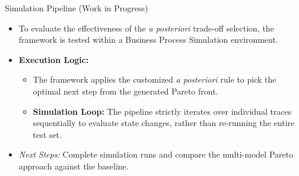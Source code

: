 \documentclass[aspectratio=169]{beamer} %
\begin{document}
\begin{frame}{Simulation Pipeline (Work in Progress)}
    \begin{itemize}
        \item To evaluate the effectiveness of the \textit{a posteriori} trade-off selection, the framework is tested within a Business Process Simulation environment.
        \item \textbf{Execution Logic:}
        \begin{itemize}
            \item The framework applies the customized \textit{a posteriori} rule to pick the optimal next step from the generated Pareto front.
            \item \textbf{Simulation Loop:} The pipeline strictly iterates over individual traces sequentially to evaluate state changes, rather than re-running the entire test set.
        \end{itemize}
        \item \textit{Next Steps:} Complete simulation runs and compare the multi-model Pareto approach against the baseline.
    \end{itemize}
\end{frame}
\end{document}
